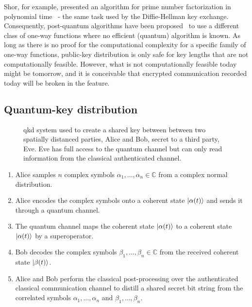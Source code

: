 Shor, for example, presented an algorithm for prime number factorization in polynomial time~\cite{Shor1994} - the same task used by the Diffie-Hellman key exchange.
Consequently, post-quantum algorithms have been proposed~\cite{Bernstein2017,Chen2016} to use a different class of one-way functions where no efficient (quantum) algorithm is known.
As long as there is no proof for the computational complexity for a specific family of one-way functions, public-key distribution is only safe for key lengths that are not computationally feasible.
However, what is not computationally feasible today might be tomorrow, and it is conceivable that encrypted communication recorded today will be broken in the feature.

\FloatBarrier
\subsection{Quantum-key distribution}

\begin{figure}[htb]
	\centering
	
	\caption{\Gls{qkd} system used to create a shared key between between two spatially distanced parties, Alice and Bob, secret to a third party, Eve. Eve has full access to the quantum channel but can only read information from the classical authenticated channel.}
\end{figure}



\begin{enumerate}
	\item Alice samples $n$ complex symbols $\alpha_1,\dots,\alpha_n\in\mathbb{C}$ from a complex normal distribution.
	\item Alice encodes the complex symbols onto a coherent state $\ket{\alpha(t)}$ and sends it through a quantum channel.
	\item The quantum channel maps the coherent state $\ket{\alpha(t)}$ to a coherent state $\ket{\alpha(t)}$ by a superoperator.
	\item Bob decodes the complex symbols $\beta_1,\dots,\beta_n\in\mathbb{C}$ from the received coherent state $\ket{\beta(t)}$.
	\item Alice and Bob perform the classical post-processing over the authenticated classical communication channel to distill a shared secret bit string from the correlated symbols $\alpha_1,\dots,\alpha_n$ and $\beta_1,\dots,\beta_n$.
\end{enumerate}

